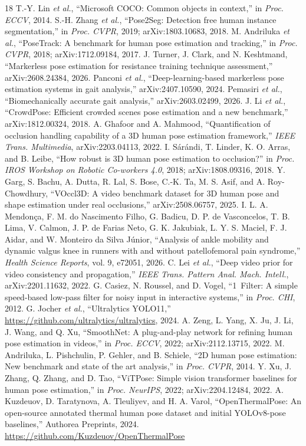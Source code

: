 \documentclass[10pt,conference]{IEEEtran}
\begin{document}
\begin{thebibliography}{18}
 T.-Y. Lin \emph{et al.}, ``Microsoft COCO: Common objects in context,'' in \emph{Proc. ECCV}, 2014.
 S.-H. Zhang \emph{et al.}, ``Pose2Seg: Detection free human instance segmentation,'' in \emph{Proc. CVPR}, 2019; arXiv:1803.10683, 2018.
 M. Andriluka \emph{et al.}, ``PoseTrack: A benchmark for human pose estimation and tracking,'' in \emph{Proc. CVPR}, 2018; arXiv:1712.09184, 2017.
 J. Turner, J. Clark, and N. Keshtmand, ``Markerless pose estimation for resistance training technique assessment,'' arXiv:2608.24384, 2026.
 Panconi \emph{et al.}, ``Deep-learning-based markerless pose estimation systems in gait analysis,'' arXiv:2407.10590, 2024.
 Pemasiri \emph{et al.}, ``Biomechanically accurate gait analysis,'' arXiv:2603.02499, 2026.
 J. Li \emph{et al.}, ``CrowdPose: Efficient crowded scenes pose estimation and a new benchmark,'' arXiv:1812.00324, 2018.
 A. Ghafoor and A. Mahmood, ``Quantification of occlusion handling capability of a 3D human pose estimation framework,'' \emph{IEEE Trans. Multimedia}, arXiv:2203.04113, 2022.
 I. S\'ar\'andi, T. Linder, K. O. Arras, and B. Leibe, ``How robust is 3D human pose estimation to occlusion?'' in \emph{Proc. IROS Workshop on Robotic Co-workers 4.0}, 2018; arXiv:1808.09316, 2018.
 Y. Garg, S. Bachu, A. Dutta, R. Lal, S. Bose, C.-K. Ta, M. S. Asif, and A. Roy-Chowdhury, ``VOccl3D: A video benchmark dataset for 3D human pose and shape estimation under real occlusions,'' arXiv:2508.06757, 2025.
 I. L. A. Mendon\c{c}a, F. M. do Nascimento Filho, G. Badicu, D. P. de Vasconcelos, T. B. Lima, V. Calmon, J. P. de Farias Neto, G. K. Jakubiak, L. Y. S. Maciel, F. J. Aidar, and W. Monteiro da Silva J\'unior, ``Analysis of ankle mobility and dynamic valgus knee in runners with and without patellofemoral pain syndrome,'' \emph{Health Science Reports}, vol. 9, e72051, 2026.
 C. Lei \emph{et al.}, ``Deep video prior for video consistency and propagation,'' \emph{IEEE Trans. Pattern Anal. Mach. Intell.}, arXiv:2201.11632, 2022.
 G. Casiez, N. Roussel, and D. Vogel, ``1\texteuro\ Filter: A simple speed-based low-pass filter for noisy input in interactive systems,'' in \emph{Proc. CHI}, 2012.
 G. Jocher \emph{et al.}, ``Ultralytics YOLO11,'' \url{https://github.com/ultralytics/ultralytics}, 2024.
 A. Zeng, L. Yang, X. Ju, J. Li, J. Wang, and Q. Xu, ``SmoothNet: A plug-and-play network for refining human pose estimation in videos,'' in \emph{Proc. ECCV}, 2022; arXiv:2112.13715, 2022.
 M. Andriluka, L. Pishchulin, P. Gehler, and B. Schiele, ``2D human pose estimation: New benchmark and state of the art analysis,'' in \emph{Proc. CVPR}, 2014.
 Y. Xu, J. Zhang, Q. Zhang, and D. Tao, ``ViTPose: Simple vision transformer baselines for human pose estimation,'' in \emph{Proc. NeurIPS}, 2022; arXiv:2204.12484, 2022.
 A. Kuzdeuov, D. Taratynova, A. Tleuliyev, and H. A. Varol, ``OpenThermalPose: An open-source annotated thermal human pose dataset and initial YOLOv8-pose baselines,'' Authorea Preprints, 2024. \url{https://github.com/Kuzdeuov/OpenThermalPose}
\end{thebibliography}
\end{document}

